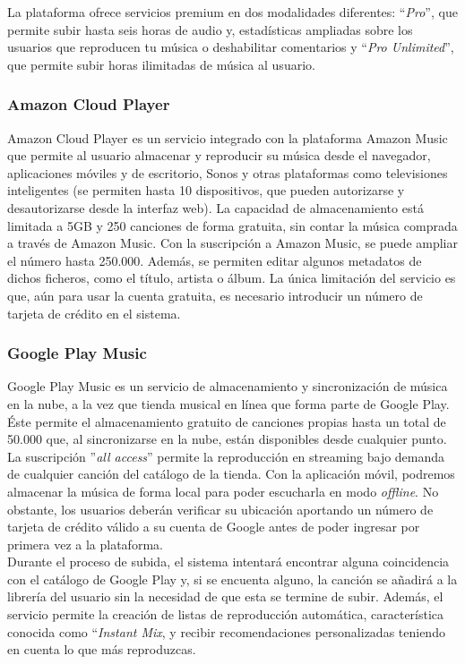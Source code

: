 La plataforma ofrece servicios premium en dos modalidades diferentes: ``\textit{Pro}'', que permite subir hasta seis horas de audio y, estadísticas ampliadas sobre los usuarios que reproducen tu música o deshabilitar comentarios y ``\textit{Pro Unlimited}'', que permite subir horas ilimitadas de música al usuario.

\subsubsection{Amazon Cloud Player \cite{ACP}} 
Amazon Cloud Player es un servicio integrado con la plataforma Amazon Music que permite al usuario almacenar y reproducir su música desde el navegador, aplicaciones móviles y de escritorio, Sonos y otras plataformas como televisiones inteligentes (se permiten hasta 10 dispositivos, que pueden autorizarse y desautorizarse desde la interfaz web). La capacidad de almacenamiento está limitada a 5GB y 250 canciones de forma gratuita, sin contar la música comprada a través de Amazon Music. Con la suscripción a Amazon Music, se puede ampliar el número hasta 250.000. Además, se permiten editar algunos metadatos de dichos ficheros, como el título, artista o álbum. La única limitación del servicio es que, aún para usar la cuenta gratuita, es necesario introducir un número de tarjeta de crédito en el sistema.

\subsubsection{Google Play Music \cite{GPM}}
Google Play Music es un servicio de almacenamiento y sincronización de música en la nube, a la vez que tienda musical en línea que forma parte de Google Play. Éste permite el almacenamiento gratuito de canciones propias hasta un total de 50.000 que, al sincronizarse en la nube, están disponibles desde cualquier punto. La suscripción ''\textit{all access}'' permite la reproducción en streaming bajo demanda de cualquier canción del catálogo de la tienda. Con la aplicación móvil, podremos almacenar la música de forma local para poder escucharla en modo \textit{offline}. No obstante, los usuarios deberán verificar su ubicación aportando un número de tarjeta de crédito válido a su cuenta de Google antes de poder ingresar por primera vez a la plataforma.\\

Durante el proceso de subida, el sistema intentará encontrar alguna coincidencia con el catálogo de Google Play y, si se encuenta alguno, la canción se añadirá a la librería del usuario sin la necesidad de que esta se termine de subir. Además, el servicio permite la creación de listas de reproducción automática, característica conocida como ``\textit{Instant Mix}, y recibir recomendaciones personalizadas teniendo en cuenta lo que más reproduzcas.

